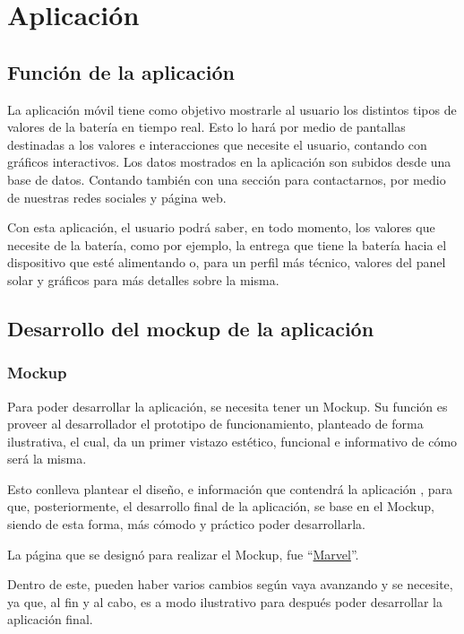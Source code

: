 \chapter{Aplicación}

    \section{Función de la aplicación}
        La aplicación móvil tiene como objetivo mostrarle al usuario los distintos tipos de valores de la batería en tiempo real. Esto lo hará por medio de pantallas destinadas a los valores e interacciones que necesite el usuario, contando con gráficos interactivos. Los datos mostrados en la aplicación son subidos desde una base de datos. Contando también con una sección para contactarnos, por medio de nuestras redes sociales y página web.\par
        Con esta aplicación, el usuario podrá saber, en todo momento, los valores que necesite de la batería, como por ejemplo, la entrega que tiene la batería hacia el dispositivo que esté alimentando o, para un perfil más técnico, valores del panel solar y gráficos para más detalles sobre la misma.\par

    \section{Desarrollo del mockup de la aplicación}
    
        \subsection{Mockup}
            	Para poder desarrollar la aplicación, se necesita tener un Mockup. Su función es proveer al desarrollador el prototipo de funcionamiento, planteado de forma ilustrativa, el cual, da un primer vistazo estético, funcional e informativo de cómo será la misma. \par
                Esto conlleva plantear el diseño, e información que contendrá la aplicación , para que, posteriormente, el desarrollo final de la aplicación, se base en el Mockup, siendo de esta forma, más cómodo y práctico poder desarrollarla.\par
                La página que se designó para realizar el Mockup, fue “\href{https://marvelapp.com}{Marvel}”.\par
                Dentro de este, pueden haber varios cambios según vaya avanzando y se necesite, ya que, al fin y al cabo, es a modo ilustrativo para después poder desarrollar la aplicación final.\par
                
